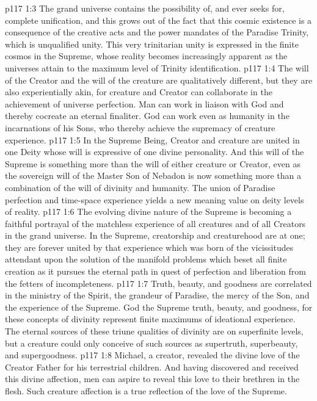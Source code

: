 \vs p117 1:3 The grand universe contains the possibility of, and ever seeks for, complete unification, and this grows out of the fact that this cosmic existence is a consequence of the creative acts and the power mandates of the Paradise Trinity, which is unqualified unity. This very trinitarian unity is expressed in the finite cosmos in the Supreme, whose reality becomes increasingly apparent as the universes attain to the maximum level of Trinity identification.
\vs p117 1:4 \pc The will of the Creator and the will of the creature are qualitatively different, but they are also experientially akin, for creature and Creator can collaborate in the achievement of universe perfection. Man can work in liaison with God and thereby cocreate an eternal finaliter. God can work even as humanity in the incarnations of his Sons, who thereby achieve the supremacy of creature experience.
\vs p117 1:5 In the Supreme Being, Creator and creature are united in one Deity whose will is expressive of one divine personality. And this will of the Supreme is something more than the will of either creature or Creator, even as the sovereign will of the Master Son of Nebadon is now something more than a combination of the will of divinity and humanity. The union of Paradise perfection and time\hyp{}space experience yields a new meaning value on deity levels of reality.
\vs p117 1:6 The evolving divine nature of the Supreme is becoming a faithful portrayal of the matchless experience of all creatures and of all Creators in the grand universe. In the Supreme, creatorship and creaturehood are at one; they are forever united by that experience which was born of the vicissitudes attendant upon the solution of the manifold problems which beset all finite creation as it pursues the eternal path in quest of perfection and liberation from the fetters of incompleteness.
\vs p117 1:7 \pc Truth, beauty, and goodness are correlated in the ministry of the Spirit, the grandeur of Paradise, the mercy of the Son, and the experience of the Supreme. God the Supreme  truth, beauty, and goodness, for these concepts of divinity represent finite maximums of ideational experience. The eternal sources of these triune qualities of divinity are on superfinite levels, but a creature could only conceive of such sources as supertruth, superbeauty, and supergoodness.
\vs p117 1:8 Michael, a creator, revealed the divine love of the Creator Father for his terrestrial children. And having discovered and received this divine affection, men can aspire to reveal this love to their brethren in the flesh. Such creature affection is a true reflection of the love of the Supreme.

